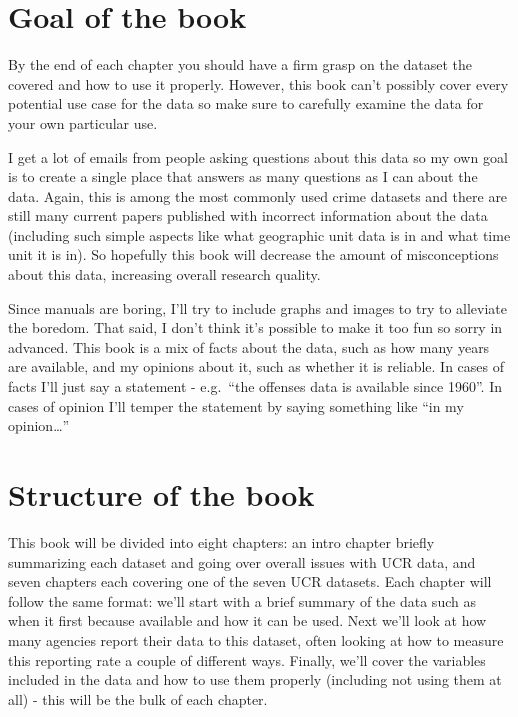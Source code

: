 \documentclass[
  12pt,
  openany]{book}
\begin{document}
\hypertarget{goal-of-the-book}{%
\section{Goal of the book}\label{goal-of-the-book}}

By the end of each chapter you should have a firm grasp on the dataset the covered and how to use it properly. However, this book can't possibly cover every potential use case for the data so make sure to carefully examine the data for your own particular use.

I get a lot of emails from people asking questions about this data so my own goal is to create a single place that answers as many questions as I can about the data. Again, this is among the most commonly used crime datasets and there are still many current papers published with incorrect information about the data (including such simple aspects like what geographic unit data is in and what time unit it is in). So hopefully this book will decrease the amount of misconceptions about this data, increasing overall research quality.

Since manuals are boring, I'll try to include graphs and images to try to alleviate the boredom. That said, I don't think it's possible to make it too fun so sorry in advanced. This book is a mix of facts about the data, such as how many years are available, and my opinions about it, such as whether it is reliable. In cases of facts I'll just say a statement - e.g.~``the offenses data is available since 1960''. In cases of opinion I'll temper the statement by saying something like ``in my opinion\ldots{}''

\hypertarget{structure-of-the-book}{%
\section{Structure of the book}\label{structure-of-the-book}}

This book will be divided into eight chapters: an intro chapter briefly summarizing each dataset and going over overall issues with UCR data, and seven chapters each covering one of the seven UCR datasets. Each chapter will follow the same format: we'll start with a brief summary of the data such as when it first because available and how it can be used. Next we'll look at how many agencies report their data to this dataset, often looking at how to measure this reporting rate a couple of different ways. Finally, we'll cover the variables included in the data and how to use them properly (including not using them at all) - this will be the bulk of each chapter.
\end{document}
